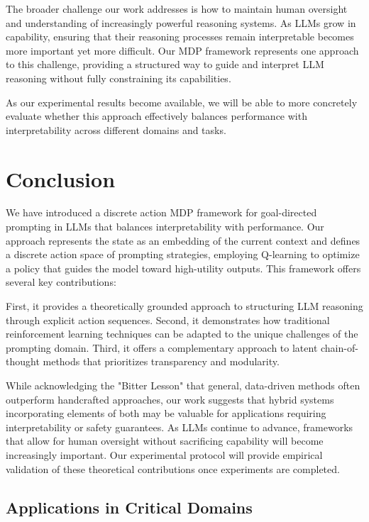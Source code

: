 \documentclass[10pt,journal,compsoc]{IEEEtran}
\begin{document}
The broader challenge our work addresses is how to maintain human oversight and understanding of increasingly powerful reasoning systems. As LLMs grow in capability, ensuring that their reasoning processes remain interpretable becomes more important yet more difficult. Our MDP framework represents one approach to this challenge, providing a structured way to guide and interpret LLM reasoning without fully constraining its capabilities.

As our experimental results become available, we will be able to more concretely evaluate whether this approach effectively balances performance with interpretability across different domains and tasks.

\section{Conclusion}

We have introduced a discrete action MDP framework for goal-directed prompting in LLMs that balances interpretability with performance. Our approach represents the state as an embedding of the current context and defines a discrete action space of prompting strategies, employing Q-learning to optimize a policy that guides the model toward high-utility outputs. This framework offers several key contributions:

First, it provides a theoretically grounded approach to structuring LLM reasoning through explicit action sequences. Second, it demonstrates how traditional reinforcement learning techniques can be adapted to the unique challenges of the prompting domain. Third, it offers a complementary approach to latent chain-of-thought methods that prioritizes transparency and modularity.

While acknowledging the "Bitter Lesson" that general, data-driven methods often outperform handcrafted approaches, our work suggests that hybrid systems incorporating elements of both may be valuable for applications requiring interpretability or safety guarantees. As LLMs continue to advance, frameworks that allow for human oversight without sacrificing capability will become increasingly important. Our experimental protocol will provide empirical validation of these theoretical contributions once experiments are completed.

\subsection{Applications in Critical Domains}
\end{document}
